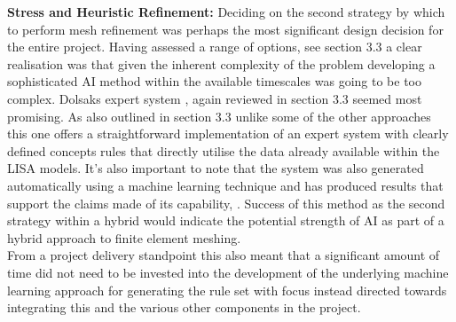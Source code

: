 \noindent
\textbf{Stress and Heuristic Refinement: } 
Deciding on the second strategy by which to perform mesh refinement was perhaps the most significant design decision for the entire project. Having assessed a range of options, see section 3.3 a clear realisation was that given the inherent complexity of the problem developing a sophisticated AI method within the available timescales was going to be too complex. Dolsaks expert system \cite{DolsakPaper91, DolsakPaper94}, again reviewed in section 3.3 seemed most promising. As also outlined in section 3.3 unlike some of the other approaches this one offers a straightforward implementation of an expert system with clearly defined concepts rules that  directly utilise the data already available within the LISA models. It's also important to note that the system was also generated automatically using a machine learning technique and has produced results that support the claims made of its capability, \cite{DolsakPaper91, DolsakPaper94, appOfILPToFEMeshDesign}. Success of this method as the second strategy within a hybrid would indicate the potential strength of AI as part of a hybrid approach to finite element meshing. \\



\noindent
From a project delivery standpoint this also meant that a significant amount of time did not need to be invested into the development of the underlying machine learning approach for generating the rule set with focus instead directed towards integrating this and the various other components in the project.





\noindent




